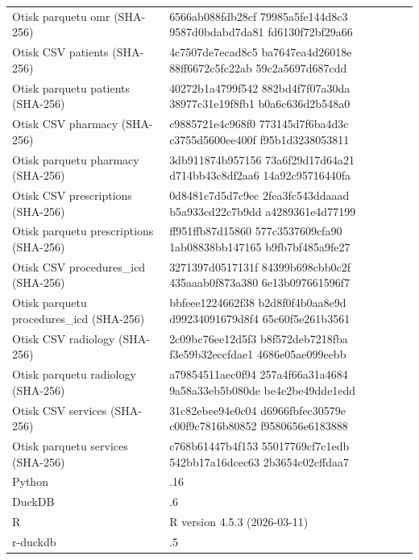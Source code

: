 \begin{tabular}{>{\raggedright\arraybackslash}p{}>{\raggedright\arraybackslash}p{}}
Otisk parquetu omr (SHA-256) & 6566ab088fdb28cf 79985a5fe144d8c3 9587d0bdabd7da81 fd6130f72bf29a66\\
Otisk CSV patients (SHA-256) & 4c7507de7ecad8c5 ba7647ea4d26018e 88ff6672c5fc22ab 59c2a5697d687cdd\\
Otisk parquetu patients (SHA-256) & 40272b1a4799f542 882bd4f7f07a30da 38977c31e19f8fb1 b0a6c636d2b548a0\\
Otisk CSV pharmacy (SHA-256) & c9885721e4c968f0 773145d7f6ba4d3c c3755d5600ee400f f95b1d3238053811\\
Otisk parquetu pharmacy (SHA-256) & 3db911874b957156 73a6f29d17d64a21 d714bb43c8df2aa6 14a92c95716440fa\\
Otisk CSV prescriptions (SHA-256) & 0d8481c7d5d7c9ec 2fea3fc543ddaaad b5a933cd22c7b9dd a4289361e4d77199\\
Otisk parquetu prescriptions (SHA-256) & ff951ffb87d15860 577c3537609cfa90 1ab08838bb147165 b9fb7bf485a9fe27\\
Otisk CSV procedures\_icd (SHA-256) & 3271397d0517131f 84399b698cbb0c2f 435aaab0f873a380 6e13b097661596f7\\
Otisk parquetu procedures\_icd (SHA-256) & bbfeee1224662f38 b2d8f0f4b0aa8e9d d99234091679d8f4 65c60f5e261b3561\\
Otisk CSV radiology (SHA-256) & 2c09bc76ee12d5f3 b8f572deb7218fba f3e59b32eccfdae1 4686e05ae099eebb\\
Otisk parquetu radiology (SHA-256) & a79854511aec0f94 257a4f66a31a4684 9a58a33eb5b080de be4e2be49dde1edd\\
Otisk CSV services (SHA-256) & 31c82ebee94e0c04 d6966fbfec30579e c00f9c7816b80852 f9580656e6183888\\
Otisk parquetu services (SHA-256) & c768b61447b4f153 55017769cf7c1edb 542bb17a16dcec63 2b3654c02cffdaa7\\
Python & 3.13.16\\
DuckDB & 1.5.6\\
R & R version 4.5.3 (2026-03-11)\\
r-duckdb & 1.5.5\\
\bottomrule
\end{tabular}
